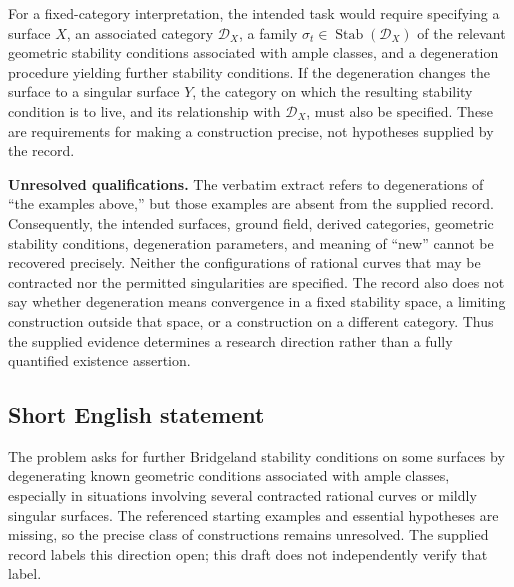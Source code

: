 \documentclass[11pt]{article}
\begin{document}
For a fixed-category interpretation, the intended task would require specifying a surface \(X\), an associated category \(\mathcal D_X\), a family \(\sigma_t\in\operatorname{Stab}(\mathcal D_X)\) of the relevant geometric stability conditions associated with ample classes, and a degeneration procedure yielding further stability conditions. If the degeneration changes the surface to a singular surface \(Y\), the category on which the resulting stability condition is to live, and its relationship with \(\mathcal D_X\), must also be specified. These are requirements for making a construction precise, not hypotheses supplied by the record.

\textbf{Unresolved qualifications.} The verbatim extract refers to degenerations of ``the examples above,'' but those examples are absent from the supplied record. Consequently, the intended surfaces, ground field, derived categories, geometric stability conditions, degeneration parameters, and meaning of ``new'' cannot be recovered precisely. Neither the configurations of rational curves that may be contracted nor the permitted singularities are specified. The record also does not say whether degeneration means convergence in a fixed stability space, a limiting construction outside that space, or a construction on a different category. Thus the supplied evidence determines a research direction rather than a fully quantified existence assertion.
\subsection{Short English statement}
The problem asks for further Bridgeland stability conditions on some surfaces by degenerating known geometric conditions associated with ample classes, especially in situations involving several contracted rational curves or mildly singular surfaces. The referenced starting examples and essential hypotheses are missing, so the precise class of constructions remains unresolved. The supplied record labels this direction open; this draft does not independently verify that label.
\end{document}
